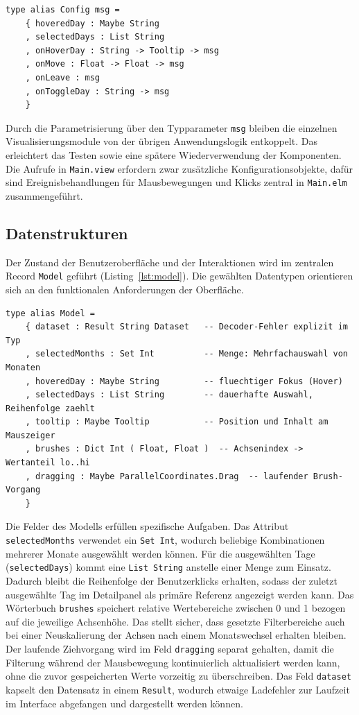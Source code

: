 \begin{lstlisting}[caption={Config-Record der Heatmap: Zustandsausschnitt und Callbacks},label={lst:config}]
type alias Config msg =
    { hoveredDay : Maybe String
    , selectedDays : List String
    , onHoverDay : String -> Tooltip -> msg
    , onMove : Float -> Float -> msg
    , onLeave : msg
    , onToggleDay : String -> msg
    }
\end{lstlisting}

Durch die Parametrisierung über den Typparameter \texttt{msg} bleiben die einzelnen Visualisierungsmodule von der übrigen Anwendungslogik entkoppelt. Das erleichtert das Testen sowie eine spätere Wiederverwendung der Komponenten. Die Aufrufe in \texttt{Main.view} erfordern zwar zusätzliche Konfigurationsobjekte, dafür sind Ereignisbehandlungen für Mausbewegungen und Klicks zentral in \texttt{Main.elm} zusammengeführt.

\subsection*{Datenstrukturen}

Der Zustand der Benutzeroberfläche und der Interaktionen wird im zentralen Record \texttt{Model} geführt (Listing~\ref{lst:model}). Die gewählten Datentypen orientieren sich an den funktionalen Anforderungen der Oberfläche.

\begin{lstlisting}[caption={Zentrales Model mit allen Interaktionszuständen},label={lst:model}]
type alias Model =
    { dataset : Result String Dataset   -- Decoder-Fehler explizit im Typ
    , selectedMonths : Set Int          -- Menge: Mehrfachauswahl von Monaten
    , hoveredDay : Maybe String         -- fluechtiger Fokus (Hover)
    , selectedDays : List String        -- dauerhafte Auswahl, Reihenfolge zaehlt
    , tooltip : Maybe Tooltip           -- Position und Inhalt am Mauszeiger
    , brushes : Dict Int ( Float, Float )  -- Achsenindex -> Wertanteil lo..hi
    , dragging : Maybe ParallelCoordinates.Drag  -- laufender Brush-Vorgang
    }
\end{lstlisting}

Die Felder des Modells erfüllen spezifische Aufgaben. Das Attribut \texttt{selectedMonths} verwendet ein \texttt{Set Int}, wodurch beliebige Kombinationen mehrerer Monate ausgewählt werden können. Für die ausgewählten Tage (\texttt{selectedDays}) kommt eine \texttt{List String} anstelle einer Menge zum Einsatz. Dadurch bleibt die Reihenfolge der Benutzerklicks erhalten, sodass der zuletzt ausgewählte Tag im Detailpanel als primäre Referenz angezeigt werden kann. Das Wörterbuch \texttt{brushes} speichert relative Wertebereiche zwischen 0 und 1 bezogen auf die jeweilige Achsenhöhe. Das stellt sicher, dass gesetzte Filterbereiche auch bei einer Neuskalierung der Achsen nach einem Monatswechsel erhalten bleiben. Der laufende Ziehvorgang wird im Feld \texttt{dragging} separat gehalten, damit die Filterung während der Mausbewegung kontinuierlich aktualisiert werden kann, ohne die zuvor gespeicherten Werte vorzeitig zu überschreiben. Das Feld \texttt{dataset} kapselt den Datensatz in einem \texttt{Result}, wodurch etwaige Ladefehler zur Laufzeit im Interface abgefangen und dargestellt werden können.

